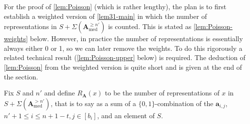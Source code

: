 \documentclass[11pt,reqno]{amsart}
\numberwithin{equation}{section}
\theoremstyle{definition}
\theoremstyle{remark}
\newcommand{\mbf}{\mathbf}
\renewcommand{\le}{\leqslant}
\renewcommand{\ge}{\geqslant}
\def\med{\operatorname{med}}
\begin{document}
For the proof of \cref{lem:Poisson} (which is rather lengthy), the plan is to first establish a weighted version of \cref{lem31-main} in which the number of representations in $S + \Sigma(\mbf{A}_{\med}^{\ge n'})$ is counted. This is stated as \cref{lem:Poisson-weights} below. However, in practice the number of representations is essentially always either 0 or 1, so we can later remove the weights. To do this rigorously a related technical result (\cref{lem:Poisson-upper} below) is required. The deduction of \cref{lem:Poisson} from the weighted version is quite short and is given at the end of the section.

Fix $S$ and $n'$ and define $R_{\mbf{A}}(x)$ to be the number of representations of $x$ in $S + \Sigma(\mbf{A}_{\med}^{> n'})$, that is to say as a sum of a $\{0,1\}$-combination of the $\mbf{a}_{i,j}$, $n'+1 \le i \le n + 1 - t, j \in [b_i]$, and an element of $S$. 
\end{document}
